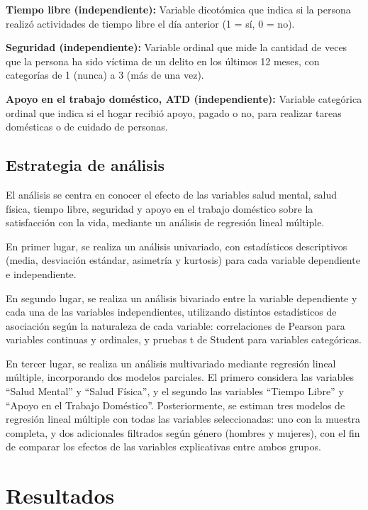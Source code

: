 \documentclass[
  spanish,
  a4paper,
  oneside]{scrbook}
\begin{document}
\textbf{Tiempo libre (independiente):} Variable dicotómica que indica si
la persona realizó actividades de tiempo libre el día anterior (1 = sí,
0 = no).

\textbf{Seguridad (independiente):} Variable ordinal que mide la
cantidad de veces que la persona ha sido víctima de un delito en los
últimos 12 meses, con categorías de 1 (nunca) a 3 (más de una vez).

\textbf{Apoyo en el trabajo doméstico, ATD (independiente):} Variable
categórica ordinal que indica si el hogar recibió apoyo, pagado o no,
para realizar tareas domésticas o de cuidado de personas.

\section{Estrategia de análisis}\label{estrategia-de-anuxe1lisis}

El análisis se centra en conocer el efecto de las variables salud
mental, salud física, tiempo libre, seguridad y apoyo en el trabajo
doméstico sobre la satisfacción con la vida, mediante un análisis de
regresión lineal múltiple.

En primer lugar, se realiza un análisis univariado, con estadísticos
descriptivos (media, desviación estándar, asimetría y kurtosis) para
cada variable dependiente e independiente.

En segundo lugar, se realiza un análisis bivariado entre la variable
dependiente y cada una de las variables independientes, utilizando
distintos estadísticos de asociación según la naturaleza de cada
variable: correlaciones de Pearson para variables continuas y ordinales,
y pruebas t de Student para variables categóricas.

En tercer lugar, se realiza un análisis multivariado mediante regresión
lineal múltiple, incorporando dos modelos parciales. El primero
considera las variables ``Salud Mental'' y ``Salud Física'', y el
segundo las variables ``Tiempo Libre'' y ``Apoyo en el Trabajo
Doméstico''. Posteriormente, se estiman tres modelos de regresión lineal
múltiple con todas las variables seleccionadas: uno con la muestra
completa, y dos adicionales filtrados según género (hombres y mujeres),
con el fin de comparar los efectos de las variables explicativas entre
ambos grupos.


\chapter{Resultados}\label{resultados}
\end{document}

